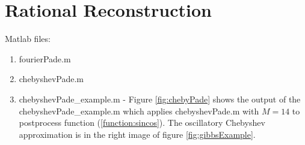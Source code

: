 \documentclass[12pt]{article}
\begin{document}
\section{Rational Reconstruction}

Matlab files:
\begin{enumerate}
  \item fourierPade.m
  \item chebyshevPade.m
  \item chebyshevPade\_example.m - Figure \ref{fig:chebyPade} shows the output of the chebyshevPade\_example.m which applies chebyshevPade.m with $M=14$ to postprocess function (\ref{function:sincos}).  The oscillatory Chebyshev approximation is in the right image of figure \ref{fig:gibbsExample}.
\end{enumerate}
\end{document}
